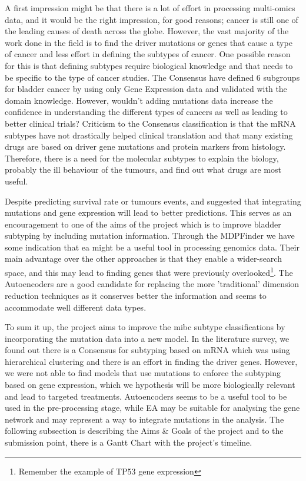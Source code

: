 A first impression might be that there is a lot of effort in processing multi-omics data, and it would be the right impression, for good reasons; cancer is still one of the leading causes of death across the globe. However, the vast majority of the work done in the field is to find the driver mutations or genes that cause a type of cancer and less effort in defining the subtypes of cancer. One possible reason for this is that defining subtypes require biological knowledge and that needs to be specific to the type of cancer studies. The Consensus \citet{Kamoun2020-tj} have defined 6 subgroups for bladder cancer by using only Gene Expression data and validated with the domain knowledge. However, wouldn't adding mutations data increase the confidence in understanding the different types of cancers as well as leading to better clinical trials? Criticism to the Consensus classification is that the mRNA subtypes have not drastically helped clinical translation and that many existing drugs are based on driver gene mutations and protein markers from histology. Therefore, there is a need for the molecular subtypes to explain the biology, probably the ill behaviour of the tumours, and find out what drugs are most useful. 


Despite predicting survival rate or tumours events, \citet{Chaudhary2018-qj} and \citet{Ma2019-hk} suggested that integrating mutations and gene expression will lead to better predictions. This serves as an encouragement to one of the aims of the project which is to improve bladder subtyping by including mutation information. Through the MDPFinder \citet{Zhao2012-wj} we have some indication that \acrfull{ea} might be a useful tool in processing genomics data. Their main advantage over the other approaches is that they enable a wider-search space, and this may lead to finding genes that were previously overlooked\footnote{Remember the example of TP53 gene expression}. The Autoencoders are a good candidate for replacing the more 'traditional' dimension reduction techniques as it conserves better the information and seems to accommodate well different data types. 

To sum it up, the project aims to improve the \acrfull{mibc} subtype classifications by incorporating the mutation data into a new model. In the literature survey, we found out there is a Consensus for subtyping based on mRNA which was using hierarchical clustering and there is an effort in finding the driver genes. However, we were not able to find models that use mutations to enforce the subtyping based on gene expression, which we hypothesis will be more biologically relevant and lead to targeted treatments. Autoencoders seems to be a useful tool to be used in the pre-processing stage, while EA may be suitable for analysing the gene network and may represent a way to integrate mutations in the analysis. The following subsection is describing the Aims \& Goals of the project and to the submission point, there is a Gantt Chart with the project's timeline.

